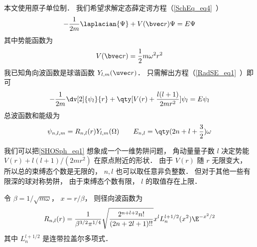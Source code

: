 
\begin{issues}
\issueDraft
\end{issues}


本文使用原子单位制． 我们希望求解定态薛定谔方程（\autoref{SchEq_eq4}~）
\begin{equation}
-\frac{1}{2m} \laplacian {\Psi} + V(\bvec r)\Psi = E \Psi
\end{equation}
其中势能函数为
\begin{equation}
V(\bvec r) = \frac{1}{2}m\omega^2 r^2
\end{equation}
我已知角向波函数是球谐函数 $Y_{l,m}(\uvec r)$． 只需解出方程（\autoref{RadSE_eq1}~）即可
\begin{equation}\label{SHOSph_eq1}
-\frac{1}{2m} \dv[2]{\psi_l}{r} + \qty[V(r) + \frac{l(l + 1)}{2mr^2}]\psi_l = E\psi_l
\end{equation}
总波函数和能级为
\begin{equation}
\psi_{n,l,m} = R_{n,l}(r) Y_{l,m}(\Omega)
\qquad
E_{n,l} = \qty(2n + l + \frac32) \omega
\end{equation}    

我们可以把\autoref{SHOSph_eq1} 想象成一个一维势阱问题， 角动量量子数 $l$ 决定势能 $V(r) + l(l + 1)/(2mr^2)$ 在原点附近的形状． 由于 $V(r)$ 随 $r$ 无限变大， 所以总的束缚态个数是无限的， $n, l$ 也可以取任意非负整数． 但对于其他一些有限深的球对称势阱， 由于束缚态个数有限， $l$ 的取值存在上限．

令 $\beta = 1/\sqrt{m\omega}$， $x = r/\beta$， 则径向波函数为
\begin{equation}
R_{n,l}(r) = \frac{1}{\beta^{3/2} \pi^{1/4}} \sqrt{\frac{2^{n+l+2} n!}{(2n + 2l + 1)!!}} x^l L_n^{l+1/2}(x^2) \E^{-x^2/2}
\end{equation}
其中 $L_n^{l+1/2}$ 是连带拉盖尔多项式．

